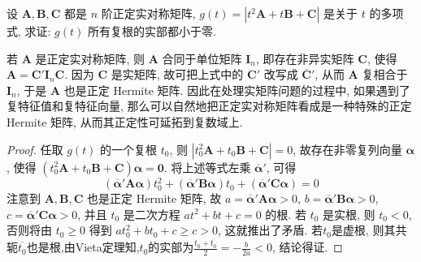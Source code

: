 \documentclass[../../main.tex]{subfiles}%
\begin{document}
\begin{example}
设 \(\boldsymbol{A},\boldsymbol{B},\boldsymbol{C}\) 都是 \(n\) 阶正定实对称矩阵, \(g(t)=|t^2\boldsymbol{A}+t\boldsymbol{B}+\boldsymbol{C}|\) 是关于 \(t\) 的多项式, 求证: \(g(t)\) 所有复根的实部都小于零.
\end{example}
\begin{remark}
若 \(\boldsymbol{A}\) 是正定实对称矩阵, 则 \(\boldsymbol{A}\) 合同于单位矩阵 \(\boldsymbol{I}_n\), 即存在非异实矩阵 \(\boldsymbol{C}\), 使得 \(\boldsymbol{A}=\boldsymbol{C}'\boldsymbol{I}_n\boldsymbol{C}\). 因为 \(\boldsymbol{C}\) 是实矩阵, 故可把上式中的 \(\boldsymbol{C}'\) 改写成 \(\overline{\boldsymbol{C}}'\), 从而 \(\boldsymbol{A}\) 复相合于 \(\boldsymbol{I}_n\), 于是 \(\boldsymbol{A}\) 也是正定 Hermite 矩阵. 因此在处理实矩阵问题的过程中, 如果遇到了复特征值和复特征向量, 那么可以自然地把正定实对称矩阵看成是一种特殊的正定 Hermite 矩阵, 从而其正定性可延拓到复数域上. 
\end{remark}
\begin{proof}

任取 \(g(t)\) 的一个复根 \(t_0\), 则 \(|t_0^2\boldsymbol{A}+t_0\boldsymbol{B}+\boldsymbol{C}| = 0\), 故存在非零复列向量 \(\boldsymbol{\alpha}\), 使得 \((t_0^2\boldsymbol{A}+t_0\boldsymbol{B}+\boldsymbol{C})\boldsymbol{\alpha}=\boldsymbol{0}\). 将上述等式左乘 \(\overline{\boldsymbol{\alpha}}'\), 可得
\[(\overline{\boldsymbol{\alpha}}'\boldsymbol{A}\boldsymbol{\alpha})t_0^2+(\overline{\boldsymbol{\alpha}}'\boldsymbol{B}\boldsymbol{\alpha})t_0+(\overline{\boldsymbol{\alpha}}'\boldsymbol{C}\boldsymbol{\alpha}) = 0\]
注意到 \(\boldsymbol{A},\boldsymbol{B},\boldsymbol{C}\) 也是正定 Hermite 矩阵, 故 \(a=\overline{\boldsymbol{\alpha}}'\boldsymbol{A}\boldsymbol{\alpha}>0\), \(b=\overline{\boldsymbol{\alpha}}'\boldsymbol{B}\boldsymbol{\alpha}>0\), \(c=\overline{\boldsymbol{\alpha}}'\boldsymbol{C}\boldsymbol{\alpha}>0\), 并且 \(t_0\) 是二次方程 \(at^2 + bt + c = 0\) 的根. 若 \(t_0\) 是实根, 则 \(t_0<0\), 否则将由 \(t_0\geqslant 0\) 得到 \(at_0^2+bt_0 + c\geqslant  c>0\), 这就推出了矛盾. 若\(t_0\)是虚根, 则其共轭$\overline{t_0}$也是根,由Vieta定理知,\(t_0\)的实部为\(\frac{t_0+\overline{t_0}}{2}=-\frac{b}{2a}<0\), 结论得证.

\end{proof}
\end{document}
